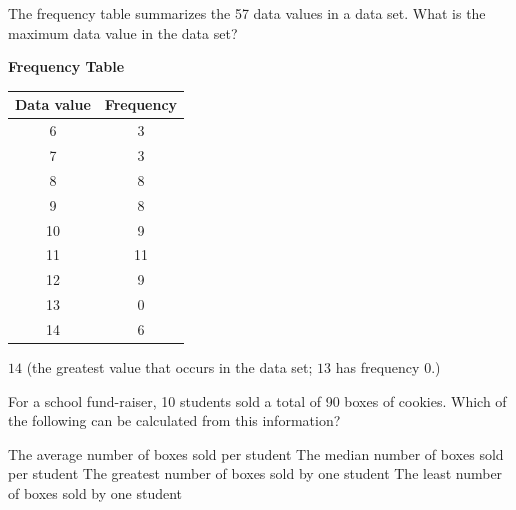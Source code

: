 \newpage



\question[1]
The frequency table summarizes the 57 data values in a data set. What is the maximum data value in the data set?
\vspace{0.5em}
\begin{center}
  \renewcommand{\arraystretch}{1.3}
  \setlength{\tabcolsep}{0.5em}
  {\textbf{Frequency Table}\par}
  \vspace{0.35em}
  \begin{tabular}{|c|c|}
    \hline
    \rowcolor[HTML]{E0E0E0}
    \textbf{Data value} & \textbf{Frequency} \\
    \hline
    6 & 3 \\
    \hline
    7 & 3 \\
    \hline
    8 & 8 \\
    \hline
    9 & 8 \\
    \hline
    10 & 9 \\
    \hline
    11 & 11 \\
    \hline
    12 & 9 \\
    \hline
    13 & 0 \\
    \hline
    14 & 6 \\
    \hline
  \end{tabular}
\end{center}
\begin{solutionorbox}
$14$ (the greatest value that occurs in the data set; $13$ has frequency $0$.)
\end{solutionorbox}


\question[1]
For a school fund-raiser, 10 students sold a total of 90 boxes of cookies. Which of the following can be calculated from this information?
\begin{choices}
  \CorrectChoice The average number of boxes sold per student
  \choice The median number of boxes sold per student
  \choice The greatest number of boxes sold by one student
  \choice The least number of boxes sold by one student
\end{choices}


\newpage


